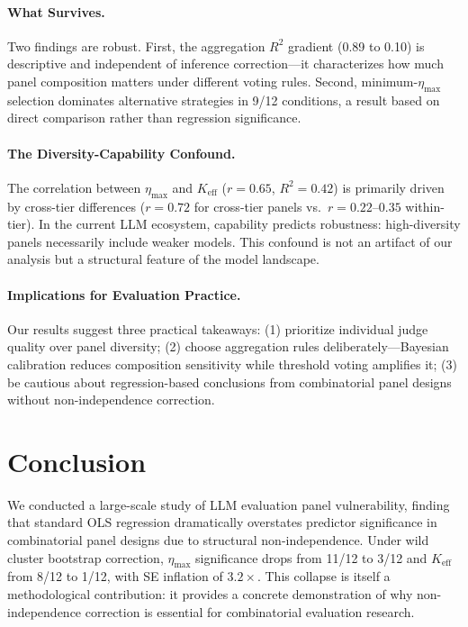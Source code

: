 \documentclass[11pt]{article}
\begin{document}
\paragraph{What Survives.} Two findings are robust. First, the aggregation $R^2$ gradient (0.89 to 0.10) is descriptive and independent of inference correction---it characterizes how much panel composition matters under different voting rules. Second, minimum-$\eta_{\max}$ selection dominates alternative strategies in 9/12 conditions, a result based on direct comparison rather than regression significance.

\paragraph{The Diversity-Capability Confound.} The correlation between $\eta_{\max}$ and $K_{\text{eff}}$ ($r = 0.65$, $R^2 = 0.42$) is primarily driven by cross-tier differences ($r = 0.72$ for cross-tier panels vs.\ $r = 0.22$--$0.35$ within-tier). In the current LLM ecosystem, capability predicts robustness: high-diversity panels necessarily include weaker models. This confound is not an artifact of our analysis but a structural feature of the model landscape.

\paragraph{Implications for Evaluation Practice.} Our results suggest three practical takeaways: (1) prioritize individual judge quality over panel diversity; (2) choose aggregation rules deliberately---Bayesian calibration reduces composition sensitivity while threshold voting amplifies it; (3) be cautious about regression-based conclusions from combinatorial panel designs without non-independence correction.


\section{Conclusion}

We conducted a large-scale study of LLM evaluation panel vulnerability, finding that standard OLS regression dramatically overstates predictor significance in combinatorial panel designs due to structural non-independence. Under wild cluster bootstrap correction, $\eta_{\max}$ significance drops from 11/12 to 3/12 and $K_{\text{eff}}$ from 8/12 to 1/12, with SE inflation of $3.2\times$. This collapse is itself a methodological contribution: it provides a concrete demonstration of why non-independence correction is essential for combinatorial evaluation research.
\end{document}
